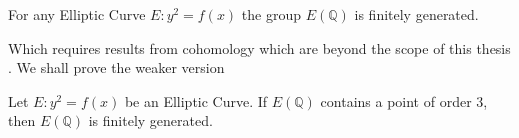 \begin{theorem}
  For any Elliptic Curve $E: y^2 = f(x)$ the group $E(\mathbb{Q})$ is finitely
  generated.
\end{theorem}
Which requires results from cohomology which are beyond the
scope of this thesis \cite[Section VIII]{silvermanArithmetic} .
We shall prove the weaker version
\begin{theorem} \label{thm:mordell}
  Let $E: y^2 = f(x)$ be an Elliptic Curve. If
  $E(\mathbb{Q})$ contains a point of order 3, then
  $E(\mathbb{Q})$ is finitely generated.
\end{theorem}
